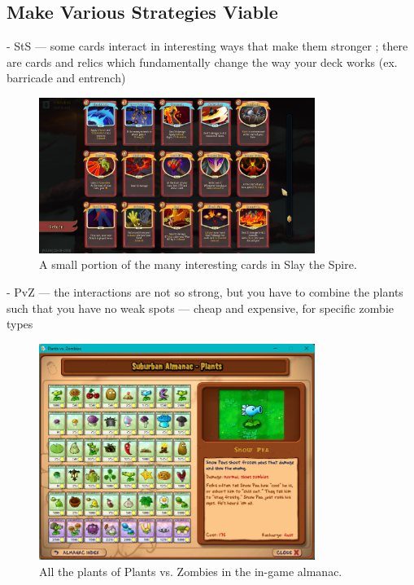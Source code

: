\subsection{Make Various Strategies Viable}

- StS --- some cards interact in interesting ways that make them stronger ; there are cards and relics which fundamentally change the way your deck works (ex. barricade and entrench)

\begin{figure}[htb]
    \centering
    \includegraphics[width=0.8\textwidth]{img/Slay-the-Spire-Compendium.png}
    \caption{A small portion of the many interesting cards in Slay the Spire.}
    \label{fig:slay-the-spire-compendium}
\end{figure}

- PvZ --- the interactions are not so strong, but you have to combine the plants such that you have no weak spots --- cheap and expensive, for specific zombie types

\begin{figure}[htb]
    \centering
    \includegraphics[width=0.8\textwidth]{img/Plants-vs-Zombies-Almanac.png}
    \caption{All the plants of Plants vs. Zombies in the in-game almanac.}
    \label{fig:plants-vs-zombies-almanac}
\end{figure}

